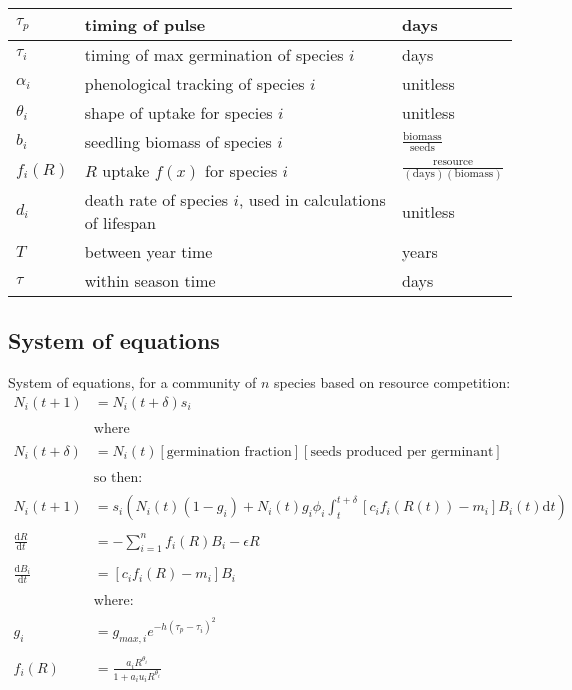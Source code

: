 \documentclass[11pt,a4paper,oneside]{article}
\begin{document}
\begin{center}
\begin{table}[h!]
\begin{tabular}{ | p{3.0cm} | p{6.0cm} | p{4.0cm} |}
\(\tau_{p}\) & timing of pulse & days \\ \hline
\(\tau_{i}\) & timing of max germination of species \(i\) & days \\ \hline
\(\alpha_{i}\) & phenological tracking of species \(i\) & unitless \\ \hline
\(\theta_{i}\) & shape of uptake for species \(i\) & unitless\\ \hline
\hline
\(b_{i}\) & seedling biomass of species \(i\) & \(\frac{\text{biomass}}{\text{seeds}}\) \\ \hline
\(f_{i}(R)\) & \(R\) uptake \(f(x)\) for species \(i\) & \(\frac{\text{resource}}{(\text{days})(\text{biomass})}\)\\ \hline
\(d_{i}\) & death rate of species \(i\), used in calculations of lifespan & unitless \\ \hline
\(T\) & between year time & years \\ \hline
\(\tau\) & within season time & days \\ \hline
\hline
\end{tabular}
\end{table}
\end{center}

\newpage
\subsection{System of equations}
\noindent System of equations, for a community of \(n\) species based
on resource competition:
\begin{align*}
N_{i}(t+1) & = N_{i}(t+\delta)s_{i}
\\
\\
& \text{where}
\\
\\
N_{i}(t+\delta) & = N_{i}(t) [\text{germination fraction}][\text{seeds
  produced per germinant}]
\\
\\
& \text{so then:}
\\
\\
N_{i}(t+1) & =
s_{i}(N_{i}(t)(1-g_{i})+N_{i}(t)g_{i}\phi_{i}\int_t^{t+\delta}[c_{i}f_{i}(R(t))-m_{i}]B_{i}(t)\mathrm{d}t)
\\
\\
\frac{\mathrm{d}R}{\mathrm{d}t} & = - \sum_{i=1}^{n}f_{i}(R)B_{i} -\epsilon R
\\
\\
\frac{\mathrm{d}B_{i}}{\mathrm{d}t} &  = [c_{i}f_{i}(R) - m_{i}]B_{i}
\\
\\
& \text{where:} 
\\
\\
g_{i} & = g_{max,i}e^{-h(\tau_{p}-\tau_{i})^2}
\\
\\
f_{i}(R) & = \frac{a_{i}R^{\theta_{i}}}{1+a_{i}u_{i}R^{\theta_{i}}}
\\
\end{align*}
\end{document}

